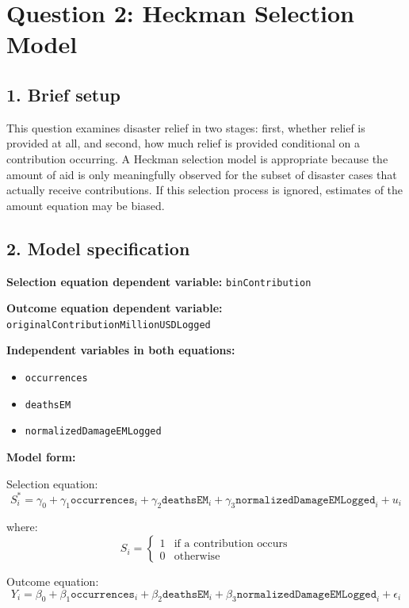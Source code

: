 \documentclass[12pt,letterpaper]{article}
\begin{document}
	\newpage
	
	\section*{Question 2: Heckman Selection Model}
	
	\subsection*{1. Brief setup}
	
	This question examines disaster relief in two stages: first, whether relief is provided at all, and second, how much relief is provided conditional on a contribution occurring. A Heckman selection model is appropriate because the amount of aid is only meaningfully observed for the subset of disaster cases that actually receive contributions. If this selection process is ignored, estimates of the amount equation may be biased.
	
	\subsection*{2. Model specification}
	
	\textbf{Selection equation dependent variable:} \texttt{binContribution}
	
	\textbf{Outcome equation dependent variable:} \texttt{originalContributionMillionUSDLogged}
	
	\textbf{Independent variables in both equations:}
	\begin{itemize}
		\item \texttt{occurrences}
		\item \texttt{deathsEM}
		\item \texttt{normalizedDamageEMLogged}
	\end{itemize}
	
	\textbf{Model form:}
	
	Selection equation:
	\[
	S_i^* = \gamma_0 + \gamma_1 \texttt{occurrences}_i + \gamma_2 \texttt{deathsEM}_i + \gamma_3 \texttt{normalizedDamageEMLogged}_i + u_i
	\]
	
	where:
	\[
	S_i =
	\begin{cases}
		1 & \text{if a contribution occurs} \\
		0 & \text{otherwise}
	\end{cases}
	\]
	
	Outcome equation:
	\[
	Y_i = \beta_0 + \beta_1 \texttt{occurrences}_i + \beta_2 \texttt{deathsEM}_i + \beta_3 \texttt{normalizedDamageEMLogged}_i + \epsilon_i
	\]
	
\end{document}
